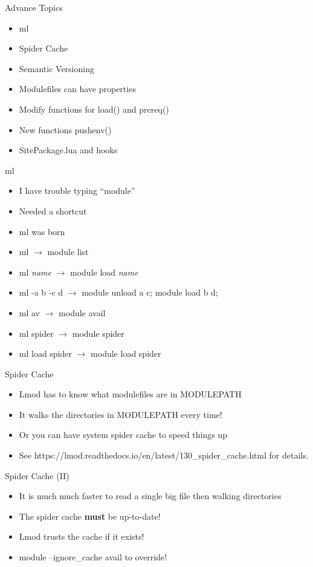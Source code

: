 \documentclass[dvipsnames,aspectratio=169]{beamer}
\begin{document}
\begin{frame}{Advance Topics}
  \begin{itemize}
    \item ml 
    \item Spider Cache
    \item Semantic Versioning
    \item Modulefiles can have properties
    \item Modify functions for load() and prereq()
    \item New functions pushenv()
    \item SitePackage.lua and hooks
  \end{itemize}
\end{frame}

\begin{frame}{ml}
  \begin{itemize}
    \item I have trouble typing ``module''
    \item Needed a shortcut
    \item ml was born
    \item ml $\rightarrow$ module list
    \item ml \emph{name} $\rightarrow$ module load \emph{name}
    \item ml -a b -c d $\rightarrow$ module unload a c; module load b d; 
    \item ml av $\rightarrow$ module avail
    \item ml spider $\rightarrow$ module spider
    \item ml load spider $\rightarrow$ module load spider
  \end{itemize}
\end{frame}

\begin{frame}{Spider Cache}
  \begin{itemize}
    \item Lmod has to know what modulefiles are in MODULEPATH
    \item It walks the directories in MODULEPATH every time!
    \item Or you can have system spider cache to speed things up
    \item See
      https://lmod.readthedocs.io/en/latest/130\_spider\_cache.html for
      details.
  \end{itemize}
\end{frame}

\begin{frame}{Spider Cache (II)}
  \begin{itemize}
    \item It is much much faster to read a single big file then
      walking directories
    \item The spider cache \textbf{must} be up-to-date!
    \item Lmod trusts the cache if it exists!
    \item module --ignore\_cache avail to override!
  \end{itemize}
\end{frame}
\end{document}

